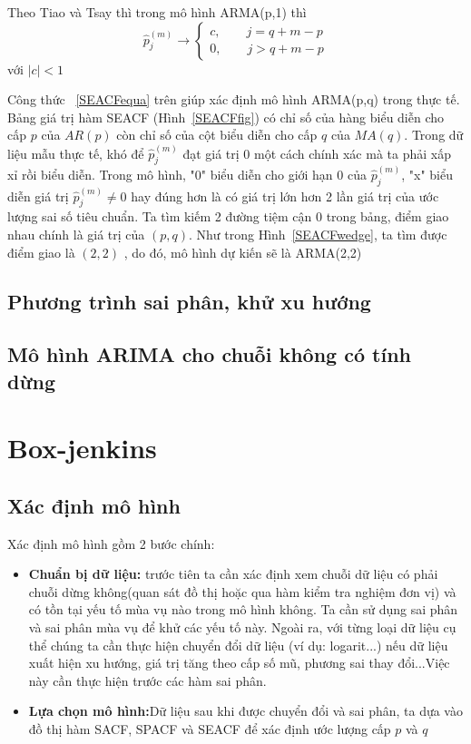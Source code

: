 \documentclass[twoside,12pt]{Latex/Classes/PhDthesisPSnPDF}
\begin{document}
Theo Tiao và Tsay thì trong mô hình ARMA(p,1) thì 
\[
	\hat{p}_j^{(m)} \longrightarrow \begin{cases}
										c,\qquad j = q+m-p \\
										0,\qquad j > q+m-p
										\end{cases}
\]\label{SEACFequa} với $|c|<1$

Công thức ~\ref{SEACFequa} trên giúp xác định mô hình ARMA(p,q) trong thực tế. Bảng giá trị hàm SEACF (Hình~\ref{SEACFfig}) có chỉ số của hàng biểu diễn cho cấp $p$ của $AR(p)$ còn chỉ số của cột biểu diễn cho cấp $q$ của $MA(q)$. %
 Trong dữ liệu mẫu thực tế, khó để $\hat{p}_j^{(m)}$ đạt giá trị 0 một cách chính xác mà ta phải xấp xỉ rồi biểu diễn. Trong mô hình, "0" biểu diễn cho giới hạn 0 của $\hat{p}_j^{(m)}$, "x" biểu diễn giá trị $\hat{p}_j^{(m)} \neq 0$ hay đúng hơn là có giá trị lớn hơn 2 lần giá trị của ước lượng sai số tiêu chuẩn. Ta tìm kiếm 2 đường tiệm cận 0 trong bảng, điểm giao nhau chính là giá trị của $(p,q)$. Như trong Hình~\ref{SEACFwedge}, ta tìm được điểm giao là $(2,2)$ , do đó, mô hình dự kiến sẽ là ARMA(2,2)
\label{SEACFwedge}
\subsection{Phương trình sai phân, khử xu hướng}
\subsection{Mô hình ARIMA cho chuỗi không có tính dừng}
\label{arima}
\section{Box-jenkins}
\label{bj}
\subsection{Xác định mô hình}
Xác định mô hình gồm 2 bước chính:
\begin{itemize}
\item \textbf{Chuẩn bị dữ liệu:} trước tiên ta cần xác định xem chuỗi dữ liệu có phải chuỗi dừng không(quan sát đồ thị hoặc qua hàm kiểm tra nghiệm đơn vị) và có tồn tại yếu tố mùa vụ nào trong mô hình không. Ta cần sử dụng sai phân và sai phân mùa vụ để khử các yếu tố này. Ngoài ra,  với từng loại dữ liệu cụ thể chúng ta cần thực hiện chuyển đổi dữ liệu (ví dụ: logarit...) nếu dữ liệu xuất hiện xu hướng, giá trị tăng theo cấp số mũ, phương sai thay đổi...Việc này cần thực hiện trước các hàm sai phân.

\item \textbf{Lựa chọn mô hình:}Dữ liệu sau khi được chuyển đổi và sai phân, ta dựa vào đồ thị hàm SACF, SPACF và SEACF để xác định ước lượng cấp $p$ và $q$
\end{itemize}
\end{document}
